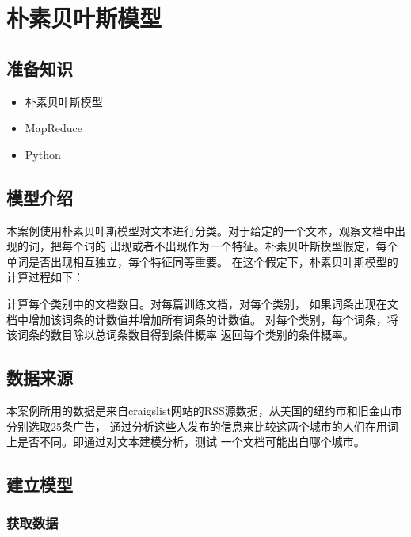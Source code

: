 \section{朴素贝叶斯模型}\label{ux5b9eux4f8bux5206ux6790ux57faux4e8emapreduceux7684ux6734ux7d20ux8d1dux53f6ux65afux6a21ux578b}

\subsection{准备知识}\label{ux51c6ux5907ux77e5ux8bc6}

\begin{itemize}
\itemsep1pt\parskip0pt
\item
  朴素贝叶斯模型
\item
  MapReduce
\item
  Python
\end{itemize}

\subsection{模型介绍}\label{ux6a21ux578bux4ecbux7ecd}

本案例使用朴素贝叶斯模型对文本进行分类。对于给定的一个文本，观察文档中出现的词，把每个词的
出现或者不出现作为一个特征。朴素贝叶斯模型假定，每个单词是否出现相互独立，每个特征同等重要。
在这个假定下，朴素贝叶斯模型的计算过程如下：%

计算每个类别中的文档数目。对每篇训练文档，对每个类别，
如果词条出现在文档中增加该词条的计数值并增加所有词条的计数值。
对每个类别，每个词条，将该词条的数目除以总词条数目得到条件概率
返回每个类别的条件概率。

\subsection{数据来源}\label{ux6570ux636eux6765ux6e90}

本案例所用的数据是来自craigslist网站的RSS源数据，从美国的纽约市和旧金山市分别选取25条广告，
通过分析这些人发布的信息来比较这两个城市的人们在用词上是否不同。即通过对文本建模分析，测试
一个文档可能出自哪个城市。

\subsection{建立模型}\label{ux5efaux7acbux6a21ux578b}

\subsubsection{获取数据}\label{ux83b7ux53d6ux6570ux636e}

